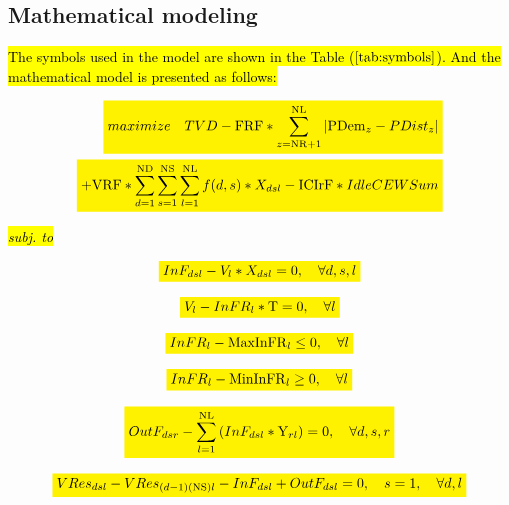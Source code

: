 \documentclass{singlecol}
\newcommand{\mathcolorbox}[2]{\colorbox{#1}{$\displaystyle #2$}}
\theoremstyle{TH}{
\newtheorem{lemma}{Lemma}
\newtheorem{theorem}[lemma]{Theorem}
\newtheorem{corrolary}[lemma]{Corrolary}
\newtheorem{conjecture}[lemma]{Conjecture}
\newtheorem{proposition}[lemma]{Proposition}
\newtheorem{claim}[lemma]{Claim}
\newtheorem{stheorem}[lemma]{Wrong Theorem}
\newtheorem{algorithm}{Algorithm}
}
\theoremstyle{THrm}{
\newtheorem{definition}{Definition}[section]
\newtheorem{question}{Question}[section]
\newtheorem{remark}{Remark}
\newtheorem{scheme}{Scheme}
}
\theoremstyle{THhit}{
\newtheorem{case}{Case}[section]
}
\begin{document}
\subsection{Mathematical modeling}
\label{sec:problemModel}
 
\hl{The symbols used in the model are shown in the Table (}\mathcolorbox{yellow}{\ref{tab:symbols}}\hl{). And the mathematical model is presented as follows:}

\begin{eqnarray} 
\label{eq:objFunc}
	 \mathcolorbox{yellow}{maximize \quad TVD - \mathrm{FRF}*\sum_{z=\mathrm{NR}+1}^{\mathrm{NL}}{|\mathrm{PDem}_{z} - PDist_{z}|}} \\ \nonumber 
	\mathcolorbox{yellow}{+ \mathrm{VRF} * \sum_{d=1}^{\mathrm{ND}}{\sum_{s=1}^{\mathrm{NS}}{\sum_{l=1}^{\mathrm{NL}}{f(d,s)*X_{dsl}}}} - \mathrm{ICIrF}*IdleCEWSum}
\end{eqnarray}

\hl{\emph{subj. to}}

\begin{equation}
	\mathcolorbox{yellow}{InF_{dsl} - V_{l} * X_{dsl} = 0, \quad \forall{d, s, l}}
	\label{eq:evalInF}
\end{equation}

\begin{equation}
	\mathcolorbox{yellow}{V_l - {InFR}_l * \mathrm{T} = 0, \quad \forall{l}}
	\label{eq:evalnFR}
\end{equation}

\begin{equation}
	\mathcolorbox{yellow}{{InFR}_l - \mathrm{MaxInFR}_{l} \leq 0, \quad \forall{l}}
	\label{eq:evalMaxInfR}
\end{equation} 

\begin{equation}
	\mathcolorbox{yellow}{{InFR}_l - \mathrm{MinInFR}_{l} \geq 0, \quad \forall{l}}
	\label{eq:evalMinInfR}
\end{equation}

\begin{equation} 
	\mathcolorbox{yellow}{OutF_{dsr} - \sum_{l=1}^{\mathrm{NL}}{(InF_{dsl}*\mathrm{Y}_{rl})} = 0, \quad \forall{d, s, r}}
	 \label{eq:evalOutFRes}
\end{equation}

\begin{equation}
	\mathcolorbox{yellow}{VRes_{dsl} - VRes_{(d-1)(\mathrm{NS})l} - InF_{dsl} + OutF_{dsl} = 0, \quad s=1, \quad \forall{d,l}}
 	\label{eq:volResT1}
\end{equation}
\end{document}
